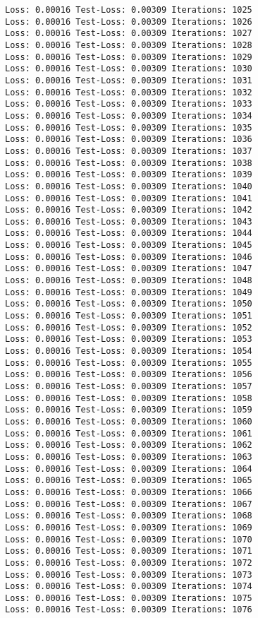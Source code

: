 \documentclass[11pt]{article}
\begin{document}
\begin{Verbatim}[commandchars=\\\{\}]
Loss: 0.00016 Test-Loss: 0.00309 Iterations: 1025
Loss: 0.00016 Test-Loss: 0.00309 Iterations: 1026
Loss: 0.00016 Test-Loss: 0.00309 Iterations: 1027
Loss: 0.00016 Test-Loss: 0.00309 Iterations: 1028
Loss: 0.00016 Test-Loss: 0.00309 Iterations: 1029
Loss: 0.00016 Test-Loss: 0.00309 Iterations: 1030
Loss: 0.00016 Test-Loss: 0.00309 Iterations: 1031
Loss: 0.00016 Test-Loss: 0.00309 Iterations: 1032
Loss: 0.00016 Test-Loss: 0.00309 Iterations: 1033
Loss: 0.00016 Test-Loss: 0.00309 Iterations: 1034
Loss: 0.00016 Test-Loss: 0.00309 Iterations: 1035
Loss: 0.00016 Test-Loss: 0.00309 Iterations: 1036
Loss: 0.00016 Test-Loss: 0.00309 Iterations: 1037
Loss: 0.00016 Test-Loss: 0.00309 Iterations: 1038
Loss: 0.00016 Test-Loss: 0.00309 Iterations: 1039
Loss: 0.00016 Test-Loss: 0.00309 Iterations: 1040
Loss: 0.00016 Test-Loss: 0.00309 Iterations: 1041
Loss: 0.00016 Test-Loss: 0.00309 Iterations: 1042
Loss: 0.00016 Test-Loss: 0.00309 Iterations: 1043
Loss: 0.00016 Test-Loss: 0.00309 Iterations: 1044
Loss: 0.00016 Test-Loss: 0.00309 Iterations: 1045
Loss: 0.00016 Test-Loss: 0.00309 Iterations: 1046
Loss: 0.00016 Test-Loss: 0.00309 Iterations: 1047
Loss: 0.00016 Test-Loss: 0.00309 Iterations: 1048
Loss: 0.00016 Test-Loss: 0.00309 Iterations: 1049
Loss: 0.00016 Test-Loss: 0.00309 Iterations: 1050
Loss: 0.00016 Test-Loss: 0.00309 Iterations: 1051
Loss: 0.00016 Test-Loss: 0.00309 Iterations: 1052
Loss: 0.00016 Test-Loss: 0.00309 Iterations: 1053
Loss: 0.00016 Test-Loss: 0.00309 Iterations: 1054
Loss: 0.00016 Test-Loss: 0.00309 Iterations: 1055
Loss: 0.00016 Test-Loss: 0.00309 Iterations: 1056
Loss: 0.00016 Test-Loss: 0.00309 Iterations: 1057
Loss: 0.00016 Test-Loss: 0.00309 Iterations: 1058
Loss: 0.00016 Test-Loss: 0.00309 Iterations: 1059
Loss: 0.00016 Test-Loss: 0.00309 Iterations: 1060
Loss: 0.00016 Test-Loss: 0.00309 Iterations: 1061
Loss: 0.00016 Test-Loss: 0.00309 Iterations: 1062
Loss: 0.00016 Test-Loss: 0.00309 Iterations: 1063
Loss: 0.00016 Test-Loss: 0.00309 Iterations: 1064
Loss: 0.00016 Test-Loss: 0.00309 Iterations: 1065
Loss: 0.00016 Test-Loss: 0.00309 Iterations: 1066
Loss: 0.00016 Test-Loss: 0.00309 Iterations: 1067
Loss: 0.00016 Test-Loss: 0.00309 Iterations: 1068
Loss: 0.00016 Test-Loss: 0.00309 Iterations: 1069
Loss: 0.00016 Test-Loss: 0.00309 Iterations: 1070
Loss: 0.00016 Test-Loss: 0.00309 Iterations: 1071
Loss: 0.00016 Test-Loss: 0.00309 Iterations: 1072
Loss: 0.00016 Test-Loss: 0.00309 Iterations: 1073
Loss: 0.00016 Test-Loss: 0.00309 Iterations: 1074
Loss: 0.00016 Test-Loss: 0.00309 Iterations: 1075
Loss: 0.00016 Test-Loss: 0.00309 Iterations: 1076

\end{Verbatim}
\end{document}

